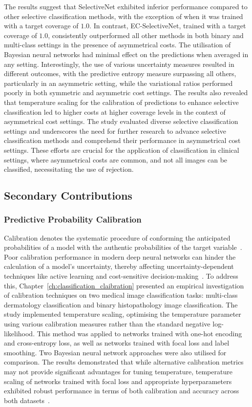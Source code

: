 The results suggest that SelectiveNet exhibited inferior performance compared to other selective classification methods, with the exception of when it was trained with a target coverage of $1.0$. In contrast, EC-SelectiveNet, trained with a target coverage of $1.0$, consistently outperformed all other methods in both binary and multi-class settings in the presence of asymmetrical costs. The utilisation of Bayesian neural networks had minimal effect on the predictions when averaged in any setting. Interestingly, the use of various uncertainty measures resulted in different outcomes, with the predictive entropy measure surpassing all others, particularly in an asymmetric setting, while the variational ratios performed poorly in both symmetric and asymmetric cost settings. The results also revealed that temperature scaling for the calibration of predictions to enhance selective classification led to higher costs at higher coverage levels in the context of asymmetrical cost settings. The study evaluated diverse selective classification settings and underscores the need for further research to advance selective classification methods and comprehend their performance in asymmetrical cost settings. These efforts are crucial for the application of classification in clinical settings, where asymmetrical costs are common, and not all images can be classified, necessitating the use of rejection.

\subsection{Secondary Contributions}
\subsubsection{Predictive Probability Calibration}
Calibration denotes the systematic procedure of conforming the anticipated probabilities of a model with the authentic probabilities of the target variable~\citep{guo2017calibration}. Poor calibration performance in modern deep neural networks can hinder the calculation of a model's uncertainty, thereby affecting uncertainty-dependent techniques like active learning and cost-sensitive decision-making~\citep{carse2021robust}. To address this, Chapter~\ref{ch:classification_claibration} presented an empirical investigation of calibration techniques on two medical image classification tasks: multi-class dermatology classification and binary histopathology image classification. The study implemented temperature scaling, optimising the temperature parameter using various calibration measures rather than the standard negative log-likelihood. This method was applied to networks trained with one-hot encoding and cross-entropy loss, as well as networks trained with focal loss and label smoothing. Two Bayesian neural network approaches were also utilised for comparison. The results demonstrated that while alternative calibration metrics may not provide significant advantages for tuning temperature, temperature scaling of networks trained with focal loss and appropriate hyperparameters exhibited robust performance in terms of both calibration and accuracy across both datasets~\citep{carse2022calibration}.

